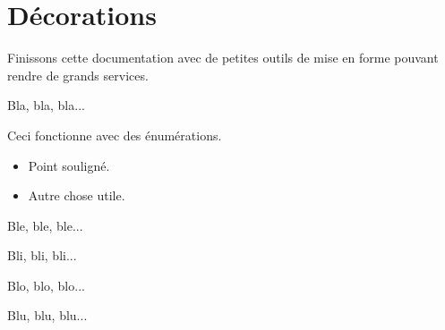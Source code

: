 

\begin{tdocexa}
    \leavevmode

\end{tdocexa}




\begin{tdocexa}
    \leavevmode

\end{tdocexa}




\begin{tdocexa}
    \leavevmode

\end{tdocexa}




\begin{tdocexa}
    \leavevmode

\end{tdocexa}


\section{Décorations}

Finissons cette documentation avec de petites outils de mise en forme pouvant rendre de grands services.


\begin{tdoclatex}[sbs]
Bla, bla, bla...

\tdocsep %

Ceci fonctionne avec des énumérations.

\begin{itemize}
    \item Point souligné.

    \item Autre chose utile.
\end{itemize}

\tdocsep %

Ble, ble, ble...

Bli, bli, bli...

\tdocxspace %

Blo, blo, blo...

Blu, blu, blu...

\end{tdoclatex}
